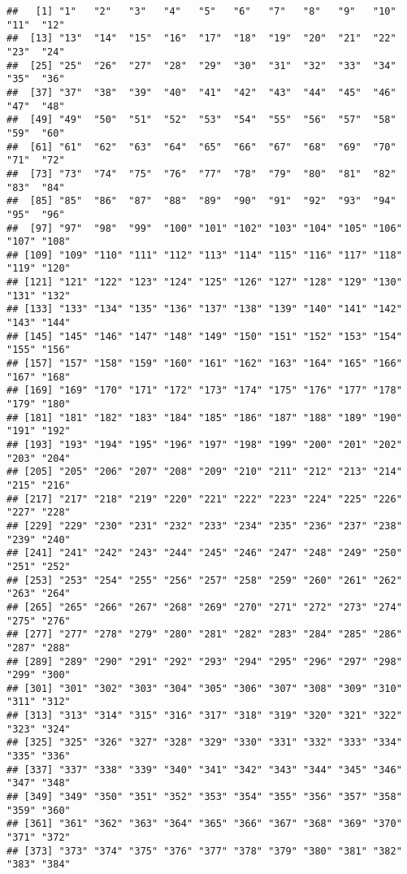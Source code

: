 \documentclass[
]{book}
\begin{document}
\begin{verbatim}
##   [1] "1"   "2"   "3"   "4"   "5"   "6"   "7"   "8"   "9"   "10"  "11"  "12" 
##  [13] "13"  "14"  "15"  "16"  "17"  "18"  "19"  "20"  "21"  "22"  "23"  "24" 
##  [25] "25"  "26"  "27"  "28"  "29"  "30"  "31"  "32"  "33"  "34"  "35"  "36" 
##  [37] "37"  "38"  "39"  "40"  "41"  "42"  "43"  "44"  "45"  "46"  "47"  "48" 
##  [49] "49"  "50"  "51"  "52"  "53"  "54"  "55"  "56"  "57"  "58"  "59"  "60" 
##  [61] "61"  "62"  "63"  "64"  "65"  "66"  "67"  "68"  "69"  "70"  "71"  "72" 
##  [73] "73"  "74"  "75"  "76"  "77"  "78"  "79"  "80"  "81"  "82"  "83"  "84" 
##  [85] "85"  "86"  "87"  "88"  "89"  "90"  "91"  "92"  "93"  "94"  "95"  "96" 
##  [97] "97"  "98"  "99"  "100" "101" "102" "103" "104" "105" "106" "107" "108"
## [109] "109" "110" "111" "112" "113" "114" "115" "116" "117" "118" "119" "120"
## [121] "121" "122" "123" "124" "125" "126" "127" "128" "129" "130" "131" "132"
## [133] "133" "134" "135" "136" "137" "138" "139" "140" "141" "142" "143" "144"
## [145] "145" "146" "147" "148" "149" "150" "151" "152" "153" "154" "155" "156"
## [157] "157" "158" "159" "160" "161" "162" "163" "164" "165" "166" "167" "168"
## [169] "169" "170" "171" "172" "173" "174" "175" "176" "177" "178" "179" "180"
## [181] "181" "182" "183" "184" "185" "186" "187" "188" "189" "190" "191" "192"
## [193] "193" "194" "195" "196" "197" "198" "199" "200" "201" "202" "203" "204"
## [205] "205" "206" "207" "208" "209" "210" "211" "212" "213" "214" "215" "216"
## [217] "217" "218" "219" "220" "221" "222" "223" "224" "225" "226" "227" "228"
## [229] "229" "230" "231" "232" "233" "234" "235" "236" "237" "238" "239" "240"
## [241] "241" "242" "243" "244" "245" "246" "247" "248" "249" "250" "251" "252"
## [253] "253" "254" "255" "256" "257" "258" "259" "260" "261" "262" "263" "264"
## [265] "265" "266" "267" "268" "269" "270" "271" "272" "273" "274" "275" "276"
## [277] "277" "278" "279" "280" "281" "282" "283" "284" "285" "286" "287" "288"
## [289] "289" "290" "291" "292" "293" "294" "295" "296" "297" "298" "299" "300"
## [301] "301" "302" "303" "304" "305" "306" "307" "308" "309" "310" "311" "312"
## [313] "313" "314" "315" "316" "317" "318" "319" "320" "321" "322" "323" "324"
## [325] "325" "326" "327" "328" "329" "330" "331" "332" "333" "334" "335" "336"
## [337] "337" "338" "339" "340" "341" "342" "343" "344" "345" "346" "347" "348"
## [349] "349" "350" "351" "352" "353" "354" "355" "356" "357" "358" "359" "360"
## [361] "361" "362" "363" "364" "365" "366" "367" "368" "369" "370" "371" "372"
## [373] "373" "374" "375" "376" "377" "378" "379" "380" "381" "382" "383" "384"

\end{verbatim}
\end{document}
